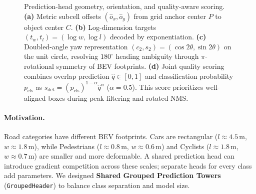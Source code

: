 \begin{figure}[t]
    \centering
    \caption{Prediction-head geometry, orientation, and quality-aware scoring. \textbf{(a)} Metric subcell offsets $(\hat{o}_x, \hat{o}_y)$ from grid anchor center $P$ to object center $C$. \textbf{(b)} Log-dimension targets $(t_w, t_l) = (\log w, \log l)$ decoded by exponentiation. \textbf{(c)} Doubled-angle yaw representation $(c_2, s_2) = (\cos 2\theta, \sin 2\theta)$ on the unit circle, resolving $180^\circ$ heading ambiguity through $\pi$-rotational symmetry of BEV footprints. \textbf{(d)} Joint quality scoring combines overlap prediction $\hat{q} \in [0, 1]$ and classification probability $p_{\mathrm{cls}}$ as $s_{\mathrm{det}} = (p_{\mathrm{cls}})^{1-\alpha} \hat{q}^\alpha$ ($\alpha = 0.5$). This score prioritizes well-aligned boxes during peak filtering and rotated NMS.}
    \label{fig:geometry_output}
\end{figure}

\paragraph{Motivation.}
Road categories have different BEV footprints. Cars are rectangular ($l \approx 4.5$\,m, $w \approx 1.8$\,m), while Pedestrians ($l \approx 0.8$\,m, $w \approx 0.6$\,m) and Cyclists ($l \approx 1.8$\,m, $w \approx 0.7$\,m) are smaller and more deformable. A shared prediction head can introduce gradient competition across these scales; separate heads for every class add parameters. We designed \textbf{Shared Grouped Prediction Towers} (\texttt{GroupedHeader}) to balance class separation and model size.

